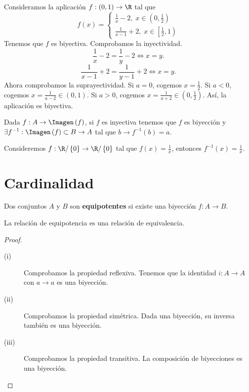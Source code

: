 \begin{eg}
\normalfont Consideramos la aplicación $\displaystyle f : \left(0,1\right) \to \R $ tal que
\[ f\left(x\right) =
\begin{cases}
\frac{1}{x}-2, \; x \in \left(0, \frac{1}{2}\right) \\
\frac{1}{x-1}+2, \; x \in \left[\frac{1}{2},1\right)
\end{cases}
\]
Tenemos que $\displaystyle f $ es biyectiva. Comprobamos la inyectividad.
\[ \frac{1}{x}-2 = \frac{1}{y}-2 \iff x = y .\]
\[\frac{1}{x-1} + 2 = \frac{1}{y-1}+2 \iff x = y .\]
Ahora comprobamos la suprayectividad. Si $\displaystyle a = 0 $, cogemos $\displaystyle x = \frac{1}{2} $. Si $\displaystyle a < 0 $, cogemos $\displaystyle x = \frac{1}{a-2} \in \left(0, 1\right) $. Si $\displaystyle a > 0 $, cogemos $\displaystyle x = \frac{1}{a+2} \in \left(0, \frac{1}{2}\right)$. Así, la aplicación es biyectiva.
\end{eg}

\begin{fdefinition}[Inversa]
\normalfont Dada $\displaystyle f : A \to \Imagen\left(f\right) $, si $\displaystyle f $ es inyectiva tenemos que $\displaystyle f $ es biyección y $\displaystyle \exists f^{-1} : \Imagen\left(f\right) \subset B \to A $ tal que $\displaystyle b \to f^{-1}\left(b\right) = a $.
\end{fdefinition}

\begin{eg}
	\normalfont Consideremos $\displaystyle f : \R/ \left\{ 0\right\}  \to \R/ \left\{ 0\right\}  $ tal que $\displaystyle f\left(x\right) = \frac{1}{x} $, entonces $\displaystyle f^{-1}\left(x\right) = \frac{1}{x} $.
\end{eg}
\section{Cardinalidad}
\begin{fdefinition}[Equipotencia]
\normalfont Dos conjuntos $\displaystyle A $ y $\displaystyle B $ son \textbf{equipotentes} si existe una biyección $\displaystyle f : A \to B $.
\end{fdefinition}

\begin{fprop}[]
\normalfont La relación de equipotencia es una relación de equivalencia.
\end{fprop}
\begin{proof}
\begin{description}
\item[(i)] Comprobamos la propiedad reflexiva. Tenemos que la identidad $\displaystyle i : A \to A $ con $\displaystyle a \to a $ es una biyección. 
\item[(ii)] Comprobamos la propiedad simétrica. Dada una biyección, su inversa también es una biyección.
\item[(iii)] Comprobamos la propiedad transitiva. La composición de biyecciones es una biyección.
\end{description}
\end{proof}

